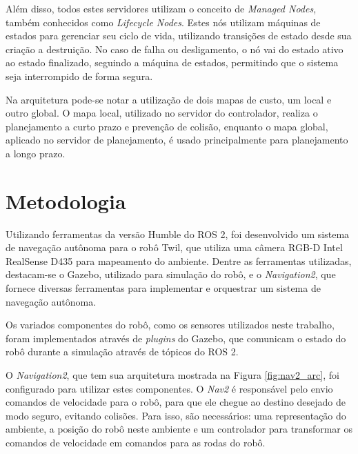 \documentclass[repeatfields,xlists,xpacks,oneside,yearsonly]{ufrgscca}
\begin{document}
Além disso, todos estes servidores utilizam o conceito de \textit{Managed Nodes},
também conhecidos como \textit{Lifecycle Nodes}.
Estes nós utilizam máquinas de estados para gerenciar seu ciclo de vida, utilizando
transições de estado desde sua criação a destruição.
No caso de falha ou desligamento, o nó vai do estado ativo ao estado finalizado,
seguindo a máquina de estados, permitindo que o sistema seja interrompido
de forma segura.

Na arquitetura pode-se notar a utilização de dois mapas de custo, um local e
outro global.
O mapa local, utilizado no servidor do controlador, realiza o planejamento
a curto prazo e prevenção de colisão, enquanto o mapa global,
aplicado no servidor de planejamento, é usado principalmente
para planejamento a longo prazo.

\chapter{Metodologia}
\label{desenvolvimento}

Utilizando ferramentas da versão Humble do ROS 2, foi desenvolvido um sistema de
navegação autônoma para o robô Twil, que utiliza uma câmera RGB-D Intel RealSense D435
para mapeamento do ambiente.
Dentre as ferramentas utilizadas, destacam-se o Gazebo, utilizado para simulação do robô,
e o \textit{Navigation2}, que fornece diversas ferramentas para implementar
e orquestrar um sistema de navegação autônoma.

Os variados componentes do robô, como os sensores utilizados neste trabalho,
foram implementados através de \textit{plugins} do Gazebo, 
que comunicam o estado do robô durante a simulação através de tópicos do ROS 2.


O \textit{Navigation2}, que tem sua arquitetura mostrada na Figura
\ref{fig:nav2_arc}, foi configurado para utilizar estes componentes.
O \textit{Nav2} é responsável pelo envio comandos de velocidade para o robô, para que ele chegue
ao destino desejado de modo seguro, evitando colisões.
Para isso, são necessários: uma representação do ambiente, a posição do robô neste ambiente e
um controlador para transformar os comandos de velocidade em comandos para as rodas do robô.
\end{document}
